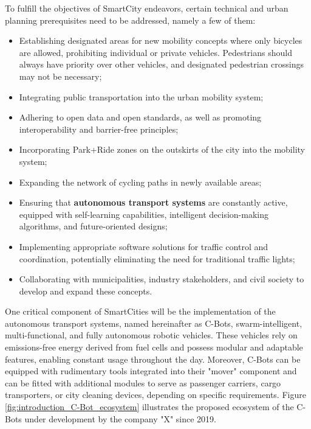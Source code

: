 To fulfill the objectives of SmartCity endeavors, certain technical and urban planning prerequisites need to be addressed, namely a few of them:

\begin{itemize}
    \item Establishing designated areas for new mobility concepts where only bicycles are allowed, prohibiting individual or private vehicles. Pedestrians should always have priority over other vehicles, and designated pedestrian crossings may not be necessary;
    \item Integrating public transportation into the urban mobility system;
    \item Adhering to open data and open standards, as well as promoting interoperability and barrier-free principles;
    \item Incorporating Park+Ride zones on the outskirts of the city into the mobility system;
    \item Expanding the network of cycling paths in newly available areas;
    \item Ensuring that \textbf{autonomous transport systems} are constantly active, equipped with self-learning capabilities, intelligent decision-making algorithms, and future-oriented designs;
    \item Implementing appropriate software solutions for traffic control and coordination, potentially eliminating the need for traditional traffic lights;
    \item Collaborating with municipalities, industry stakeholders, and civil society to develop and expand these concepts.
\end{itemize}

One critical component of SmartCities will be the implementation of the autonomous transport systems, named hereinafter as C-Bots, swarm-intelligent, multi-functional, and fully autonomous robotic vehicles. These vehicles rely on emissions-free energy derived from fuel cells and possess modular and adaptable features, enabling constant usage throughout the day. Moreover, C-Bots can be equipped with rudimentary tools integrated into their "mover" component and can be fitted with additional modules to serve as passenger carriers, cargo transporters, or city cleaning devices, depending on specific requirements. Figure \ref{fig:introduction_C-Bot_ecosystem} illustrates the proposed ecosystem of the C-Bots under development by the company "X" since 2019.

